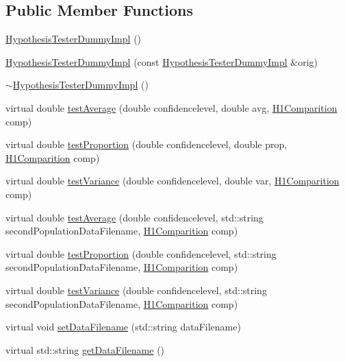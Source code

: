 \subsection*{Public Member Functions}
\begin{DoxyCompactItemize}
\item 
\hyperlink{class_hypothesis_tester_dummy_impl_aaf1b0082669d9919c8ee18cf06f97c00}{Hypothesis\+Tester\+Dummy\+Impl} ()
\item 
\hyperlink{class_hypothesis_tester_dummy_impl_a4c2878a4da9c42cacc0726016df6492b}{Hypothesis\+Tester\+Dummy\+Impl} (const \hyperlink{class_hypothesis_tester_dummy_impl}{Hypothesis\+Tester\+Dummy\+Impl} \&orig)
\item 
\hyperlink{class_hypothesis_tester_dummy_impl_a604e36c3fa5d99dfa33a86d51398223e}{$\sim$\+Hypothesis\+Tester\+Dummy\+Impl} ()
\item 
virtual double \hyperlink{class_hypothesis_tester_dummy_impl_aac603382c2eaad79a1390a42988060f5}{test\+Average} (double confidencelevel, double avg, \hyperlink{class_hypothesis_tester__if_a89153ff990252f9f79856a2f2532c349}{H1\+Comparition} comp)
\item 
virtual double \hyperlink{class_hypothesis_tester_dummy_impl_a5a96ba69b75ac822ee8c00c372309b10}{test\+Proportion} (double confidencelevel, double prop, \hyperlink{class_hypothesis_tester__if_a89153ff990252f9f79856a2f2532c349}{H1\+Comparition} comp)
\item 
virtual double \hyperlink{class_hypothesis_tester_dummy_impl_aab76d8071306f218e816d0ae26079c10}{test\+Variance} (double confidencelevel, double var, \hyperlink{class_hypothesis_tester__if_a89153ff990252f9f79856a2f2532c349}{H1\+Comparition} comp)
\item 
virtual double \hyperlink{class_hypothesis_tester_dummy_impl_a4ebaa7ef9541724941ca0bebda907171}{test\+Average} (double confidencelevel, std\+::string second\+Population\+Data\+Filename, \hyperlink{class_hypothesis_tester__if_a89153ff990252f9f79856a2f2532c349}{H1\+Comparition} comp)
\item 
virtual double \hyperlink{class_hypothesis_tester_dummy_impl_a5ee29a4c5a2ba6be62094530fa37719a}{test\+Proportion} (double confidencelevel, std\+::string second\+Population\+Data\+Filename, \hyperlink{class_hypothesis_tester__if_a89153ff990252f9f79856a2f2532c349}{H1\+Comparition} comp)
\item 
virtual double \hyperlink{class_hypothesis_tester_dummy_impl_a7503d9ce32e13e036de315b13ab5d536}{test\+Variance} (double confidencelevel, std\+::string second\+Population\+Data\+Filename, \hyperlink{class_hypothesis_tester__if_a89153ff990252f9f79856a2f2532c349}{H1\+Comparition} comp)
\item 
virtual void \hyperlink{class_hypothesis_tester_dummy_impl_a43f07179a7fd3825a00cbddf07eea13a}{set\+Data\+Filename} (std\+::string data\+Filename)
\item 
virtual std\+::string \hyperlink{class_hypothesis_tester_dummy_impl_ae30c2fa88b87f19bd62ae5e557620e3c}{get\+Data\+Filename} ()
\end{DoxyCompactItemize}
